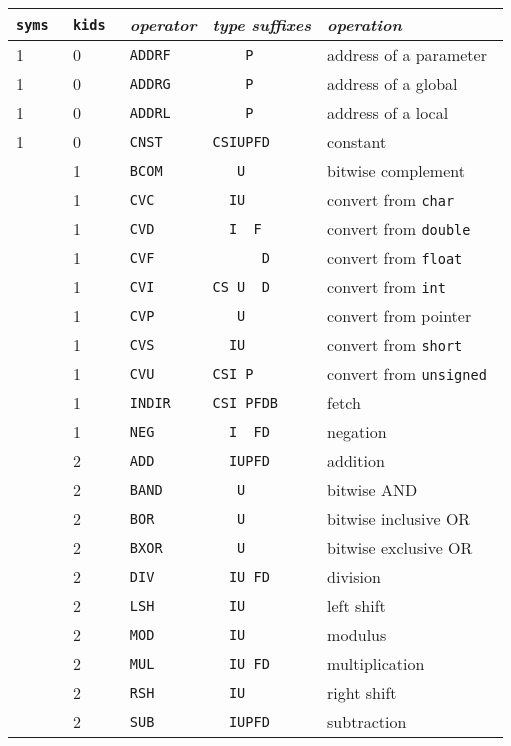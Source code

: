 \begin{table}
\begin{center}
\begin{tabular}{lllll}
\tt syms & \tt kids & \it operator & \it type suffixes	& \it operation \\ \hline
 1	& 0	& \tt ADDRF	& \verb|    P    |	& address of a parameter \\
 1	& 0	& \tt ADDRG	& \verb|    P    |	& address of a global \\
 1	& 0	& \tt ADDRL	& \verb|    P    |	& address of a local\\
 1	& 0	& \tt CNST	& \verb|CSIUPFD  |	& constant \\[1.5ex]

	& 1	& \tt BCOM	& \verb|   U     |	& bitwise complement \\
	& 1	& \tt CVC	& \verb|  IU     |	& convert from \tt char \\
	& 1	& \tt CVD	& \verb|  I  F   |	& convert from \tt double \\
	& 1	& \tt CVF	& \verb|      D  |	& convert from \tt float \\
	& 1	& \tt CVI	& \verb|CS U  D  |	& convert from \tt int \\
	& 1	& \tt CVP	& \verb|   U     |	& convert from pointer \\
	& 1	& \tt CVS	& \verb|  IU     |	& convert from \tt short \\
	& 1	& \tt CVU	& \verb|CSI P    |	& convert from \tt unsigned \\
	& 1	& \tt INDIR	& \verb|CSI PFDB |	& fetch \\
	& 1	& \tt NEG	& \verb|  I  FD  |	& negation \\[1.5ex]

	& 2	& \tt ADD	& \verb|  IUPFD  |	& addition \\
	& 2	& \tt BAND	& \verb|   U     |	& bitwise \sc AND \\
	& 2	& \tt BOR	& \verb|   U     |	& bitwise inclusive \sc OR \\
	& 2	& \tt BXOR	& \verb|   U     |	& bitwise exclusive \sc OR \\
	& 2	& \tt DIV	& \verb|  IU FD  |	& division \\
	& 2	& \tt LSH	& \verb|  IU     |	& left shift \\
	& 2	& \tt MOD	& \verb|  IU     |	& modulus \\
	& 2	& \tt MUL	& \verb|  IU FD  |	& multiplication \\
	& 2	& \tt RSH	& \verb|  IU     |	& right shift \\
	& 2	& \tt SUB	& \verb|  IUPFD  |	& subtraction \\[1.5ex]


\end{tabular}
\end{center}
\end{table}

